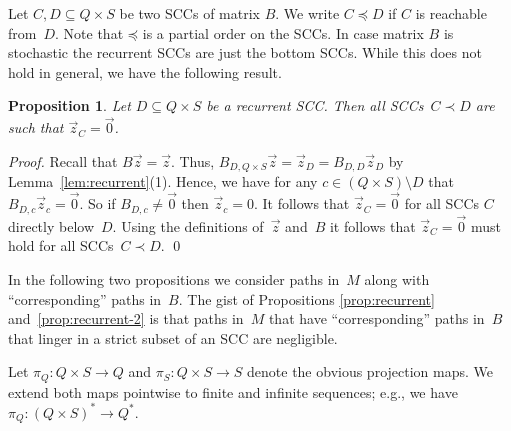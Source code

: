 \documentclass{elsarticle}
\newtheorem{proposition}[definition]{Proposition}
\begin{document}
Let $C, D \subseteq Q \times S$ be two SCCs of matrix $B$.  We write
$C \preceq D$ if $C$ is reachable from~$D$.  Note that
$\mathord{\preceq}$ is a partial order on the SCCs.
In case matrix $B$ is stochastic the recurrent SCCs are just the
bottom SCCs.  While this does not hold in general, we have the
following result.
\begin{proposition}
\label{prop:lower-matrices-zero}
Let $D \subseteq Q \times S$ be a recurrent SCC.  Then all SCCs~$C \prec D$
are such that $\vec{z}_C = \vec{0}$.
\end{proposition}
\begin{proof}
Recall that $B \vec{z} = \vec{z}$.
Thus, $B_{D,Q\times S} \vec{z} = \vec{z}_D = B_{D,D} \vec{z}_D$ by Lemma~\ref{lem:recurrent}(1).
Hence, we have for any $c \in (Q \times S) \setminus D$ that $B_{D,c} \vec{z}_c = \vec{0}$.
So if $B_{D,c} \ne \vec{0}$ then $\vec{z}_c = 0$.
It follows that $\vec{z}_C = \vec{0}$ for
all SCCs $C$ directly below~$D$.
Using the definitions of~$\vec{z}$ and~$B$ it follows that $\vec{z}_C = \vec{0}$ must hold for all SCCs~$C \prec D$.
\qed
\end{proof}

In the following two propositions we consider paths in~$M$ along with ``corresponding'' paths in~$B$.
The gist of Propositions \ref{prop:recurrent} and~\ref{prop:recurrent-2} is that paths in~$M$ that have ``corresponding'' paths in~$B$ that linger in a strict subset of an SCC are negligible.

Let $\pi_Q : Q\times S \rightarrow Q$ and $\pi_S : Q\times S
\rightarrow S$ denote the obvious projection maps.  We extend both
maps pointwise to finite and infinite sequences; e.g., we have $\pi_Q
: (Q\times S)^* \rightarrow Q^*$.
\end{document}
